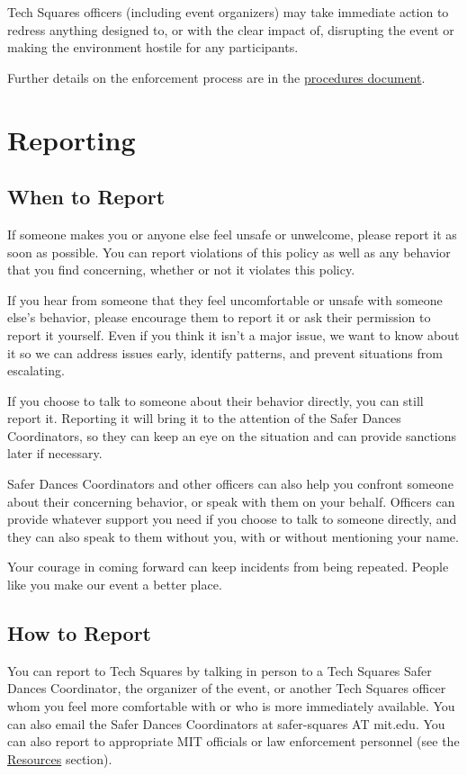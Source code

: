 \documentclass{article}
\newcommand{\baseurl}{\latexhtml{http://www.mit.edu/~tech-squares/govdocs/}{}}
\newcommand{\matchextension}{.\latexhtml{pdf}{html}}
\newcommand{\matchlink}[2]{\href{\baseurl#1\matchextension}{#2}}
\begin{document}
Tech Squares officers (including event organizers) may take immediate action to redress anything designed to, or with the clear impact of, disrupting the event or making the environment hostile for any participants.

Further details on the enforcement process are in the \matchlink{safer-dances-procedures}{procedures document}.

\section{Reporting}

\subsection*{When to Report}

If someone makes you or anyone else feel unsafe or unwelcome, please report it as soon as possible. You can report violations of this policy as well as any behavior that you find concerning, whether or not it violates this policy.

If you hear from someone that they feel uncomfortable or unsafe with someone else's behavior, please encourage them to report it or ask their permission to report it yourself. Even if you think it isn't a major issue, we want to know about it so we can address issues early, identify patterns, and prevent situations from escalating.

If you choose to talk to someone about their behavior directly, you can still report it. Reporting it will bring it to the attention of the Safer Dances Coordinators, so they can keep an eye on the situation and can provide sanctions later if necessary.

Safer Dances Coordinators and other officers can also help you confront someone about their concerning behavior, or speak with them on your behalf. Officers can provide whatever support you need if you choose to talk to someone directly, and they can also speak to them without you, with or without mentioning your name.

Your courage in coming forward can keep incidents from being repeated. People like you make our event a better place.

\subsection*{How to Report}

You can report to Tech Squares by talking in person to a Tech Squares Safer Dances Coordinator, the organizer of the event, or another Tech Squares officer whom you feel more comfortable with or who is more immediately available. You can also email the Safer Dances Coordinators at safer-squares AT mit.edu. You can also report to appropriate MIT officials or law enforcement personnel (see the \hyperref[sec:resources]{Resources} section).
\end{document}
